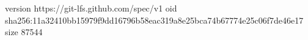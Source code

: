 version https://git-lfs.github.com/spec/v1
oid sha256:11a32410bb15979f9dd16796b58eac319a8e25bca74b67774e25c06f7de46e17
size 87544
